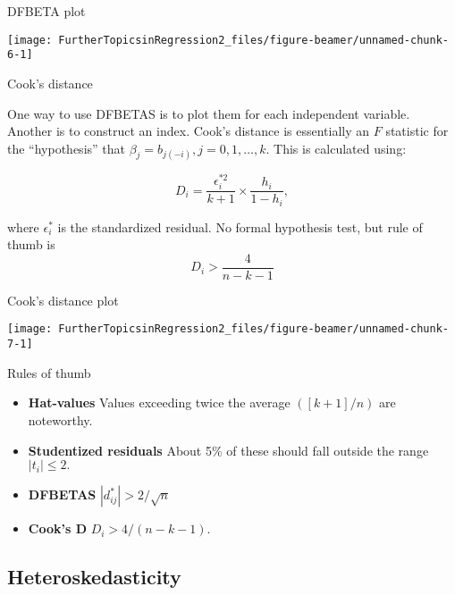\documentclass[10pt,ignorenonframetext,]{beamer}
\providecommand{\tightlist}{%
\setlength{\itemsep}{0pt}\setlength{\parskip}{0pt}}
\begin{document}
\begin{frame}{DFBETA plot}

\begin{center}\texttt{[image: FurtherTopicsinRegression2\_files/figure-beamer/unnamed-chunk-6-1]} \end{center}

\end{frame}

\begin{frame}{Cook's distance}

One way to use DFBETAS is to plot them for each independent variable.
Another is to construct an index. Cook's distance is essentially an
\(F\) statistic for the ``hypothesis'' that
\(\beta_j = b_{j(-i)}, j=0,1,\dots,k.\) This is calculated using:

\[
D_i = \frac{\epsilon^{*2}_i}{k+1} \times \frac{h_i}{1-h_i},
\]

where \(\epsilon^*_i\) is the standardized residual. No formal
hypothesis test, but rule of thumb is \[
D_i > \frac{4}{n-k-1}
\]

\end{frame}

\begin{frame}{Cook's distance plot}

\begin{center}\texttt{[image: FurtherTopicsinRegression2\_files/figure-beamer/unnamed-chunk-7-1]} \end{center}

\end{frame}

\begin{frame}{Rules of thumb}

\begin{itemize}
\tightlist
\item
  \textbf{Hat-values} Values exceeding twice the average \(([k+1]/n)\)
  are noteworthy.
\item
  \textbf{Studentized residuals} About 5\% of these should fall outside
  the range \(|t_i| \le 2.\)
\item
  \textbf{DFBETAS} \(|d_{ij}^*| > 2/\sqrt{n}\)
\item
  \textbf{Cook's D} \(D_i > 4/(n - k - 1).\)
\end{itemize}

\end{frame}

\subsection{Heteroskedasticity}\label{heteroskedasticity}
\end{document}

